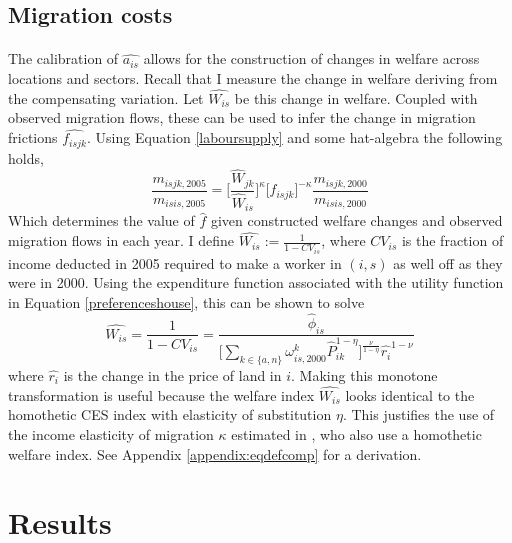 \documentclass[]{article}
\theoremstyle{plain}
\begin{document}
\subsection*{Migration costs}
\paragraph*{}
The calibration of $\hat{a_{is}}$ allows for the construction of changes in welfare across locations and sectors. Recall that I measure the change in welfare deriving from the compensating variation. Let $\hat{W_{is}}$ be this change in welfare. Coupled with observed migration flows, these can be used to infer the change in migration frictions $\hat{f_{isjk}}$. Using Equation \eqref{laboursupply} and some hat-algebra the following holds,
\begin{equation}
		\frac{m_{isjk, 2005}}{m_{isis, 2005}} = \bigg[\frac{\hat{W}_{jk}}{\hat{W}_{is}}\bigg]^{\kappa} \big[\hat{f_{isjk}}\big]^{-\kappa} \frac{m_{isjk, 2000}}{m_{isis, 2000}}
\end{equation}
Which determines the value of $\hat{f}$ given constructed welfare changes and observed migration flows in each year. I define $\hat{W_{is}} := \frac{1}{1-CV_{is}}$, where $CV_{is}$ is the fraction of income deducted in 2005 required to make a worker in $(i, s)$ as well off as they were in 2000. Using the expenditure function associated with the utility function in Equation \eqref{preferenceshouse}, this can be shown to solve  
\begin{equation}
	\hat{W_{is}} = \frac{1}{1 - CV_{is}} = \frac{\hat{\phi}_{is}}{\bigg[\sum_{k \in \{a, n\}}\omega_{is, 2000}^{k}\hat{P}_{ik}^{1-\eta}\bigg]^{\frac{\nu}{1-\eta}}\hat{r_{i}}^{1-\nu}}
\end{equation}
where $\hat{r_{i}}$ is the change in the price of land in $i$. Making this monotone transformation is useful because the welfare index $\hat{W_{is}}$ looks identical to the homothetic CES index with elasticity of substitution $\eta$. This justifies the use of the income elasticity of migration $\kappa$ estimated in \cite{tombezhu}, who also use a homothetic welfare index. See Appendix \ref{appendix:eqdefcomp} for a derivation.

\section{Results}\label{section:results}
\end{document}
